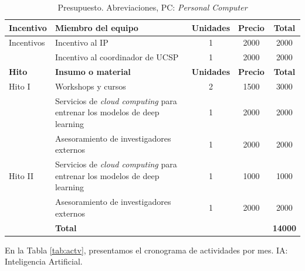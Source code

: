 \documentclass[a4paper]{article}
\begin{document}
\begin{table}[H]
	\centering
	\setlength{\tabcolsep}{0.5em} %
	{\renewcommand{\arraystretch}{1.2}%
		\caption{Presupuesto. Abreviaciones, PC: \textit{Personal Computer}}
		\label{tab:presupuesto}
		\begin{tabular}{|p{1.5cm}|p{8.2cm}|c|c|c|} \hline
			\textbf{Incentivo}    & \textbf{Miembro del equipo}    & \textbf{Unidades} & \textbf{Precio} & \textbf{Total} \\ \hline
			Incentivos & Incentivo al IP          & 1                 & 2000            & 2000           \\
			& Incentivo al coordinador de UCSP & 1                 & 2000            & 2000           \\ \hline \hline
			
			\textbf{Hito}    & \textbf{Insumo o material}    & \textbf{Unidades} & \textbf{Precio} & \textbf{Total} \\ \hline
			Hito I & Workshops y cursos       & 2                 & 1500            & 3000           \\
			& Servicios de \textit{cloud computing} para entrenar los modelos    de deep learning   & 1                 & 2000            & 2000           \\
			
			& Asesoramiento de investigadores externos      & 1                 & 2000            & 2000           \\
			 \hline
			Hito II &  Servicios de \textit{cloud computing} para entrenar los modelos    de deep learning                   & 1                 & 1000            & 1000           \\
			
			& Asesoramiento de investigadores externos      & 1                 & 2000            & 2000           \\
			
			 \hline
			& \textbf{Total}                         &                   &                 & \textbf{14000}         \\ 
			
			
			\hline
		\end{tabular}
	}
\end{table}


En la Tabla \ref{tab:actv}, presentamos el cronograma de actividades por mes. IA: Inteligencia Artificial.
\end{document}
